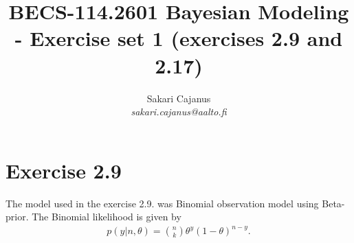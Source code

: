 \documentclass[a4paper]{article}
\title{BECS-114.2601 Bayesian Modeling - Exercise set 1 (exercises 2.9 and 2.17)}
\author{Sakari Cajanus \\ 
       {\it sakari.cajanus@aalto.fi}}
\begin{document}
\maketitle


\newpage

\section*{Exercise 2.9}
The model used in the exercise 2.9. was Binomial observation model using
Beta-prior. The Binomial likelihood is given by
\begin{align*}
    p(y | n, \theta)= {n\choose k}\theta^y(1-\theta)^{n-y}.
\end{align*}
\end{document}
